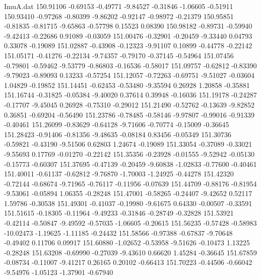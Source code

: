 \begin{filecontents}{ImuA.dat}
 150.91106   -0.69153   -0.49771   -9.84527   -0.31846   -1.06605   -0.51911
 150.93410   -0.97268   -0.80399   -9.86202   -0.92147   -0.98972   -0.21379
 150.95851   -0.81835   -0.81715   -9.65863   -0.57798    0.15523    0.08390
 150.98182   -0.89731   -0.59940   -9.42413   -0.22686    0.91089   -0.03059
 151.00476   -0.32901   -0.20459   -9.33440    0.04793    0.33078   -0.19089
 151.02887   -0.43908   -0.12323   -9.91107    0.10899   -0.44778   -0.22142
 151.05171   -0.41276   -0.22134   -9.74357   -0.79170   -0.37145   -0.54964
 151.07456   -0.79801   -0.59462   -9.53779   -0.86803   -0.16536   -0.58017
 151.09757   -0.62812   -0.83390   -9.79023   -0.89093    0.13233   -0.57254
 151.12057   -0.72263   -0.69751   -9.51027   -0.03604    1.04829   -0.19852
 151.14451   -0.62453   -0.53480   -9.35594    0.26928    1.20858   -0.35881
 151.16744   -0.31825   -0.05384   -9.40020    0.37614    0.39948   -0.16036
 151.19178   -0.24287   -0.17707   -9.45045    0.26928   -0.75310   -0.29012
 151.21490   -0.52762   -0.13639   -9.82852    0.36851   -0.69204   -0.56490
 151.23786   -0.78485   -0.58146   -9.97807   -0.99016   -0.91339   -0.40461
 151.26099   -0.83629   -0.64128   -9.71606   -0.70774   -0.15009   -0.36645
 151.28423   -0.91406   -0.81356   -9.48635   -0.08184    0.83456   -0.05349
 151.30736   -0.59821   -0.43190   -9.51506    0.62803    1.24674   -0.19089
 151.33054   -0.37089   -0.33021   -9.55693    0.17769   -0.01270   -0.22142
 151.35356   -0.23928   -0.01555   -9.52942   -0.05130   -0.15773   -0.60307
 151.37695   -0.47139   -0.20459   -9.60838   -1.02833   -0.77600   -0.40461
 151.40011   -0.61137   -0.62812   -9.76870   -1.70003   -1.24925   -0.44278
 151.42320   -0.72144   -0.68674   -9.71965   -0.76117   -0.11956   -0.07639
 151.44709   -0.88176   -0.81954   -9.53061   -0.05894    1.06355   -0.28248
 151.47001   -0.58265   -0.24407   -9.42652    0.52117    1.59786   -0.30538
 151.49301   -0.41037   -0.19980   -9.61675    0.64330   -0.00507   -0.33591
 151.51615   -0.18305   -0.11964   -9.49233   -0.31846   -0.28749   -0.32828
 151.53921   -0.42114   -0.50847   -9.49592   -0.57035   -1.06605   -0.20615
 151.56235   -0.57428   -0.58983  -10.02473   -1.19625   -1.11185   -0.24432
 151.58566   -0.97388   -0.67837   -9.70648   -0.49402    0.11706    0.09917
 151.60880   -1.02652   -0.53958   -9.51626   -0.10473    1.13225   -0.28248
 151.63208   -0.69990   -0.27039   -9.43610    0.66620    1.45284   -0.36645
 151.67859   -0.08734   -0.11007   -9.41217    0.26165    0.20102   -0.66413
 151.70223   -0.44506   -0.66042   -9.54976   -1.05123   -1.37901   -0.67940

\end{filecontents}
